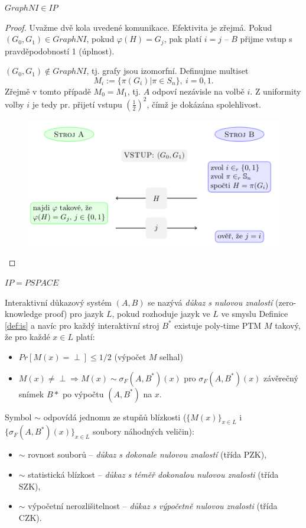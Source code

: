 \begin{claim}
	$GraphNI \in IP$
	\begin{proof}
		Uvažme dvě kola uvedené komunikace. Efektivita je zřejmá. Pokud $(G_0,G_1) \in GraphNI$, pokud $\varphi(H)=G_j$, pak platí $i=j$ -- $B$ přijme vstup s pravděpodobností 1 (úplnost).

		$(G_0,G_1)\not\in GraphNI$, tj. grafy jsou izomorfní. Definujme multiset
		\[
			M_i:=\{\pi(G_i)|\pi\in S_n\},\ i=0,1.
		\]
		Zřejmě v tomto případě $M_0=M_1$, tj. $A$ odpoví nezávisle na volbě $i$. Z uniformity volby $i$ je tedy pr. přijetí vstupu $(\frac{1}{2})^2$, čímž je dokázána spolehlivost.

		\begin{figure}[H]
			\centering
			\includegraphics[width=0.5\linewidth]{graph_niso}
		\end{figure}
	\end{proof}
\end{claim}

\begin{thm}[Shamir]
	$IP = PSPACE$
\end{thm}

\begin{defn}
	Interaktivní důkazový systém $(A,B)$ se nazývá \textit{důkaz s nulovou znalostí} (zero-knowledge proof) pro jazyk $L$, pokud rozhoduje jazyk ve $L$ ve smyslu Definice \ref{def:is} a navíc pro každý interaktivní stroj $B^*$ existuje poly-time PTM $M$ takový, že pro každé $x\in L$ platí:
	\begin{itemize}
		\item $Pr[M(x)=\perp]\leq 1/2$ (výpočet $M$ selhal)
		\item $M(x)\neq\perp\Rightarrow M(x)\sim \sigma_F(A,B^*)(x)$ pro $\sigma_F(A,B^*)(x)$ závěrečný snímek $B*$ po výpočtu $(A,B^*)$ na $x$.
	\end{itemize}
	Symbol $\sim$ odpovídá jednomu ze stupňů blízkosti ($\{M(x)\}_{x\in L}$ i $\{\sigma_F(A,B^*)(x)\}_{x\in L}$ soubory náhodných veličin):
	\begin{itemize}
		\item $\sim$ rovnost souborů -- \textit{důkaz s dokonale nulovou znalostí} (třída PZK),
		\item $\sim$ statistická blízkost -- \textit{důkaz s téměř dokonalou nulovou znalosti} (třída SZK),
		\item $\sim$ výpočetní nerozlišitelnost -- \textit{důkaz s výpočetně nulovou znalosti} (třída CZK).
	\end{itemize}
\end{defn}

